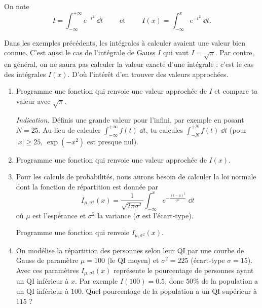 \documentclass[11pt,class=report,crop=false]{standalone}
\begin{document}



\begin{activite}


On note 
$$I = \int_{-\infty}^{+\infty} e^{-t^2}\;\dd t \qquad
\text{ et } \qquad I(x) =  \int_{-\infty}^{x} e^{-t^2}\;\dd t.$$



Dans les exemples précédents, les intégrales à calculer avaient une valeur bien connue. C'est aussi le cas de l'intégrale de Gauss $I$ qui vaut $I = \sqrt\pi$. 
Par contre, en général, on ne saura pas calculer la valeur exacte d'une intégrale :
c'est le cas des intégrales $I(x)$. D'où l'intérêt d'en trouver des valeurs approchées.
\begin{enumerate}
  \item Programme une fonction  qui renvoie une valeur approchée de $I$ et compare ta valeur avec $\sqrt \pi$.
  
  \emph{Indication.} Définis une grande valeur pour l'infini, par exemple en posant $N = 25$. Au lieu de calculer $\int_{-\infty}^{+\infty} f(t)\;\dd t$, tu calcules $\int_{-N}^{+N} f(t)\;\dd t$  (pour $|x|\ge 25$, $\exp(-x^2)$ est presque nul).
  
  \item Programme une fonction  qui renvoie une valeur approchée de $I(x)$.
  
  \item Pour les calculs de probabilités, nous aurons besoin de calculer la loi normale dont la fonction de répartition est donnée par 
  $$I_{\mu,\sigma^2}(x) =  \frac{1}{\sqrt{2\pi\sigma^2}}\int_{-\infty}^{x} e^{-\frac{(t-\mu)^2}{\sigma^2}}\;\dd t$$ 
  où $\mu$ est l'espérance et $\sigma^2$ la variance ($\sigma$ est l'écart-type).
  
  Programme une fonction  qui renvoie $I_{\mu,\sigma^2}(x)$.
  
  \item On modélise la répartition des personnes selon leur QI par une courbe de Gauss
  de paramètre $\mu = 100$ (le QI moyen) et $\sigma^2 = 225$ (écart-type $\sigma=15$). Avec ces paramètres $I_{\mu,\sigma^2}(x)$ représente le pourcentage de personnes ayant un QI inférieur à $x$. Par exemple $I(100) = 0.5$, donc $50\%$ de la population a un QI inférieur à $100$. Quel pourcentage de la population a un QI supérieur à $115$ ?
  
  
  
\end{enumerate} 

\end{activite}
\end{document}
